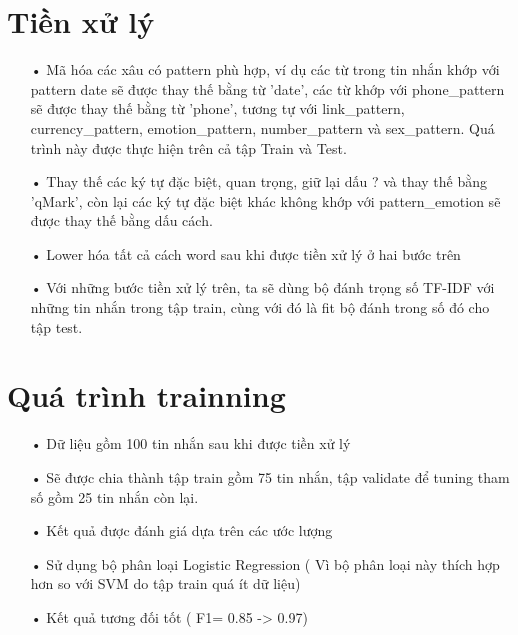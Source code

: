 \documentclass[a4paper,11pt]{report}
\begin{document}
\section{Tiền xử lý}
\begin{itemize}
\item[•] Mã hóa các xâu có pattern phù hợp, ví dụ các từ trong tin nhắn khớp với pattern date sẽ được thay thế bằng từ 'date', các từ khớp với phone\_pattern sẽ được thay thế bằng từ 'phone', tương tự với link\_pattern, currency\_pattern, emotion\_pattern, number\_pattern và sex\_pattern. Quá trình này được thực hiện trên cả tập Train và Test.
\item[•] Thay thế các ký tự đặc biệt, quan trọng, giữ lại dấu ? và thay thế bằng 'qMark', còn lại các ký tự đặc biệt khác không khớp với pattern\_emotion sẽ được thay thế bằng dấu cách.
\item[•] Lower hóa tất cả cách word sau khi được tiền xử lý ở hai bước trên
\item[•] Với những bước tiền xử lý trên, ta sẽ dùng bộ đánh trọng số TF-IDF với những tin nhắn trong tập train, cùng với đó là fit bộ đánh trong số đó cho tập test.
\end{itemize}
\section{Quá trình trainning}
\begin{itemize}
\item[•] Dữ liệu gồm 100 tin nhắn sau khi được tiền xử lý
\item[•] Sẽ được chia thành tập train gồm 75 tin nhắn, tập validate để tuning tham số gồm 25 tin nhắn còn lại.
\item[•] Kết quả được đánh giá dựa trên các ước lượng %
\item[•] Sử dụng bộ phân loại Logistic Regression ( Vì bộ phân loại này thích hợp hơn so với SVM do tập train quá ít dữ liệu)
\item[•] Kết quả tương đối tốt ( F1= 0.85 -> 0.97) 
\end{itemize}
\end{document}
